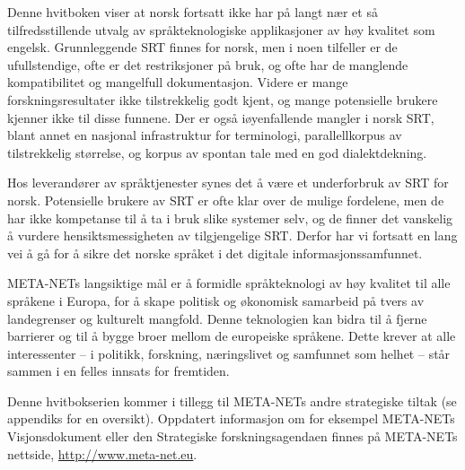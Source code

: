 \begin{multicols}{2}
Denne hvitboken viser at norsk fortsatt ikke har på langt nær et så tilfredsstillende utvalg av språkteknologiske applikasjoner av høy kvalitet som engelsk. Grunnleggende SRT finnes for norsk, men i noen tilfeller er de ufullstendige, ofte er det restriksjoner på bruk, og ofte har de manglende kompatibilitet og mangelfull dokumentasjon. Videre er mange forskningsresultater ikke tilstrekkelig godt kjent, og mange potensielle brukere kjenner ikke til disse funnene. Der er også iøyenfallende mangler i norsk SRT, blant annet en nasjonal infrastruktur for terminologi, parallellkorpus av tilstrekkelig størrelse, og korpus av spontan tale med en god dialektdekning. 

Hos leverandører av språktjenester synes det å være et underforbruk av SRT for norsk. 
Potensielle brukere av SRT er ofte klar over de mulige fordelene, men de har ikke kompetanse til å ta i bruk slike systemer selv, og de finner det vanskelig å vurdere hensiktsmessigheten av tilgjengelige SRT. 
Derfor har vi fortsatt en lang vei å gå for å sikre det norske språket i det digitale informasjonssamfunnet.

META-NETs langsiktige mål er å formidle språkteknologi av høy kvalitet til alle språkene i Europa, for å skape politisk og økonomisk samarbeid på tvers av landegrenser og kulturelt mangfold. Denne teknologien kan bidra til å fjerne barrierer og til å bygge broer mellom de europeiske språkene. Dette krever at alle interessenter – i politikk, forskning, næringslivet og samfunnet som helhet – står sammen i en felles innsats for fremtiden.

Denne hvitbokserien kommer i tillegg til META-NETs andre strategiske tiltak (se appendiks for en oversikt). Oppdatert informasjon om for eksempel META-NETs Visjonsdokument  \cite{Meta1} eller den Strategiske forskningsagendaen finnes på META-NETs nettside, \url{http://www.meta-net.eu}.
\end{multicols}

\clearpage


